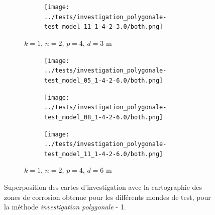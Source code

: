 \documentclass[francais,RandD]{rapportPFE}
\begin{document}
\begin{figure}[H]
\begin{subfigure}[t]{\linewidth}
\begin{subfigure}[t]{0.2\linewidth}
					\texttt{[image: ../tests/investigation\_polygonale-test\_model\_11\_1-4-2-3.0/both.png]}
				\end{subfigure}
				\caption{$k = 1$, $n = 2$, $p = 4$, $d = 3$ m}
			\end{subfigure}
			\hfill
			\begin{subfigure}[t]{\linewidth}
				\centering
				\begin{subfigure}[t]{0.2\linewidth}
					\texttt{[image: ../tests/investigation\_polygonale-test\_model\_05\_1-4-2-6.0/both.png]}
				\end{subfigure}
				\hfill
				\begin{subfigure}[t]{0.2\linewidth}
					\texttt{[image: ../tests/investigation\_polygonale-test\_model\_08\_1-4-2-6.0/both.png]}
				\end{subfigure}
				\hfill
				\begin{subfigure}[t]{0.2\linewidth}
					\texttt{[image: ../tests/investigation\_polygonale-test\_model\_11\_1-4-2-6.0/both.png]}
				\end{subfigure}
				\caption{$k = 1$, $n = 2$, $p = 4$, $d = 6$ m}
			\end{subfigure}
			\caption{Superposition des cartes d'investigation avec la cartographie des zones de corrosion obtenue pour les différents mondes de test, pour la méthode \textit{investigation polygonale} - 1.}
			\label{fig:investigation_polygonale_resultats}
		\end{figure}
\end{document}

